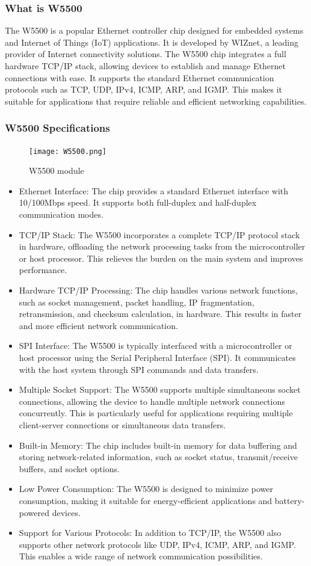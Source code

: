 \documentclass[
12pt,
oneside, 
onehalfspacing, 
nolistspacing, 
parskip, 
chapterinoneline, 
]{AASTCOMPUTER}
\begin{document}
\subsubsection{What is W5500}
The W5500 is a popular Ethernet controller chip designed for embedded systems and Internet of Things (IoT) applications. It is developed by WIZnet, a leading provider of Internet connectivity solutions.
The W5500 chip integrates a full hardware TCP/IP stack, allowing devices to establish and manage Ethernet connections with ease. It supports the standard Ethernet communication protocols such as TCP, UDP, IPv4, ICMP, ARP, and IGMP. This makes it suitable for applications that require reliable and efficient networking capabilities.
\subsubsection{W5500 Specifications}
\begin{figure}[!ht]
\centering
\texttt{[image: W5500.png]}
\caption[W5500]{W5500 module}
\label{fig:TCU}
\end{figure}
\begin{itemize}
\item Ethernet Interface: The chip provides a standard Ethernet interface with 10/100Mbps speed. It supports both full-duplex and half-duplex communication modes.
\item TCP/IP Stack: The W5500 incorporates a complete TCP/IP protocol stack in hardware, offloading the network processing tasks from the microcontroller or host processor. This relieves the burden on the main system and improves performance.
\item Hardware TCP/IP Processing: The chip handles various network functions, such as socket management, packet handling, IP fragmentation, retransmission, and checksum calculation, in hardware. This results in faster and more efficient network communication.
\item SPI Interface: The W5500 is typically interfaced with a microcontroller or host processor using the Serial Peripheral Interface (SPI). It communicates with the host system through SPI commands and data transfers.
\item Multiple Socket Support: The W5500 supports multiple simultaneous socket connections, allowing the device to handle multiple network connections concurrently. This is particularly useful for applications requiring multiple client-server connections or simultaneous data transfers.
\item Built-in Memory: The chip includes built-in memory for data buffering and storing network-related information, such as socket status, transmit/receive buffers, and socket options.
\item Low Power Consumption: The W5500 is designed to minimize power consumption, making it suitable for energy-efficient applications and battery-powered devices.
\item Support for Various Protocols: In addition to TCP/IP, the W5500 also supports other network protocols like UDP, IPv4, ICMP, ARP, and IGMP. This enables a wide range of network communication possibilities.
\end{itemize}
\end{document}
